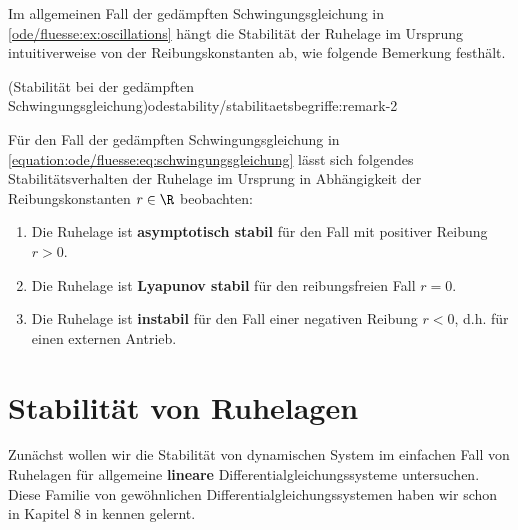 \documentclass[letterpaper,10pt,english]{jupyterBook}
\begin{document}
\par
Im allgemeinen Fall der gedämpften Schwingungsgleichung in \cref{ode/fluesse:ex:oscillations} hängt die Stabilität der Ruhelage im Ursprung intuitiverweise von der Reibungskonstanten ab, wie folgende Bemerkung festhält.
\begin{remark}{(Stabilität bei der gedämpften Schwingungsgleichung)}{odestability/stabilitaetsbegriffe:remark-2}



\par
Für den Fall der gedämpften Schwingungsgleichung in \eqref{equation:ode/fluesse:eq:schwingungsgleichung} lässt sich folgendes Stabilitätsverhalten der Ruhelage im Ursprung in Abhängigkeit der Reibungskonstanten \(r \in \R\) beobachten:
\begin{enumerate}

\item {} 
\par
Die Ruhelage ist \textbf{asymptotisch stabil} für den Fall mit positiver Reibung \(r>0\).

\item {} 
\par
Die Ruhelage ist \textbf{Lyapunov stabil} für den reibungsfreien Fall \(r=0\).

\item {} 
\par
Die Ruhelage ist \textbf{instabil} für den Fall einer negativen Reibung \(r < 0\), d.h. für einen externen Antrieb.

\end{enumerate}
\end{remark}


\section{Stabilität von Ruhelagen}
\label{\detokenize{odestability/ruhelagen:stabilitat-von-ruhelagen}}\label{\detokenize{odestability/ruhelagen::doc}}
\par
Zunächst wollen wir die Stabilität von dynamischen System im einfachen Fall von Ruhelagen für allgemeine \textbf{lineare} Differentialgleichungssysteme untersuchen.
Diese Familie von gewöhnlichen Differentialgleichungssystemen haben wir schon in Kapitel 8 in \cite{Ten21} kennen gelernt.
\end{document}
